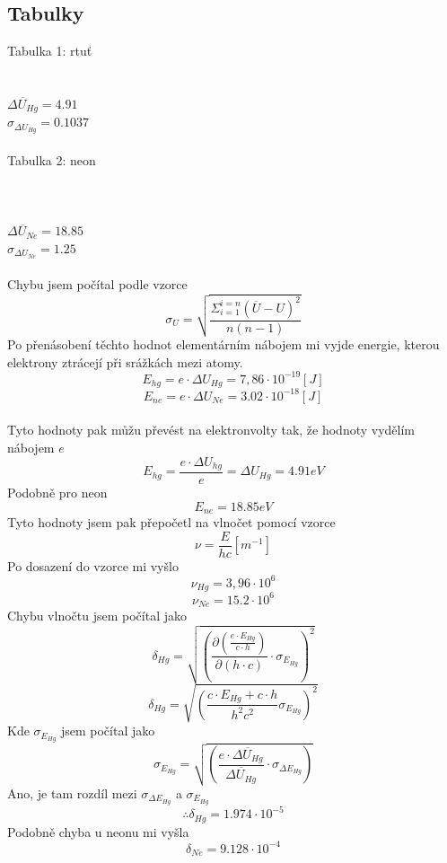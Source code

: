 \documentclass{article}
\begin{document}
\subsection{Tabulky}
\footnotesize{Tabulka 1: rtuť}\\
\\
\vspace{1em}
\\
$\overline{\Delta U_{Hg}} = 4.91$\\
$\sigma_{\Delta U}_{Hg} = 0.1037$
\\
\vspace{1em}
\\
\footnotesize{Tabulka 2: neon}\\
\\
\\
\vspace{1em}
\\
$\overline{\Delta U_{Ne}} = 18.85$\\
$\sigma_{\Delta U}_{Ne} = 1.25$
\\
\vspace{1em}
\\
Chybu jsem počítal podle vzorce
$$\sigma_{U} = \sqrt{\frac{ \Sigma_{i=1}^{i=n}(\overline{U}-U)^{2} }{n(n-1)} }$$
\vspace{2em}
Po přenásobení těchto hodnot elementárním nábojem mi vyjde energie, kterou elektrony ztrácejí při srážkách mezi atomy.
$$E_{hg} = e \cdot \Delta U_{Hg} = 7,86 \cdot 10^{-19} [J]$$
$$E_{ne} = e \cdot \Delta U_{Ne} = 3.02 \cdot 10^{-18} [J]$$
\\
Tyto hodnoty pak můžu převést na elektronvolty tak, že hodnoty vydělím nábojem $e$
$$E_{hg} = \frac{e \cdot \Delta U_{hg}}{e} = \Delta U_{Hg} = 4.91 eV$$
Podobně pro neon
$$E_{ne} = 18.85 eV$$
Tyto hodnoty jsem pak přepočetl na vlnočet pomocí vzorce
$$\nu = \frac{E}{hc} [m^{-1}]$$
Po dosazení do vzorce mi vyšlo
$$\nu_{Hg} = 3,96 \cdot 10^{6}$$
$$\nu_{Ne} = 15.2 \cdot 10^{6}$$
\newpage
Chybu vlnočtu jsem počítal jako
$$\delta_{Hg} = \sqrt{ \left(  \frac{ \partial \left( \frac{e \cdot E_{Hg}}{c \cdot h} \right) }{ \partial (h \cdot c) } \cdot \sigma_{E}_{Hg}  \right)^{2} }$$
$$\delta_{Hg} = \sqrt{ \left( \frac{c \cdot E_{Hg} + c \cdot h}{h^{2} c^{2}} \sigma_{E}_{Hg} \right)^{2} }$$
Kde $\sigma_{E}_{Hg}$ jsem počítal jako
$$\sigma_{E}_{Hg} = \sqrt{ \left( \frac{e \cdot \overline{\Delta U_{Hg}}}{\overline{\Delta U_{Hg}}} \cdot \sigma_{\Delta E}_{Hg} \right) }$$
Ano, je tam rozdíl mezi $\sigma_{\Delta E}_{Hg}$ a $\sigma_{E}_{Hg}$
$$\therefore \delta_{Hg} = 1.974 \cdot 10^{-5}$$
Podobně chyba u neonu mi vyšla
$$\delta_{Ne} = 9.128 \cdot 10^{-4}$$
\end{document}

